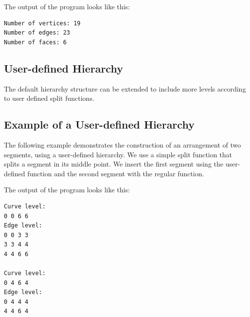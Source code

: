 
The output of the program looks like this:
\begin{verbatim}
Number of vertices: 19
Number of edges: 23
Number of faces: 6
\end{verbatim}

\begin{ccAdvanced}
\section{User-defined Hierarchy}

The default hierarchy structure can be extended to include more levels
according to user defined split functions.

\subsection{Example of a User-defined Hierarchy}
\label{ssec:example4}

The following example demonstrates the construction of an
arrangement of two segments, using a user-defined
hierarchy.
We use a simple split function that splits a segment in its middle
point. We insert the first segment using the user-defined function
and the second segment with the regular function.


The output of the program looks like this:
\begin{verbatim}
Curve level:
0 0 6 6
Edge level:
0 0 3 3
3 3 4 4
4 4 6 6

Curve level:
0 4 6 4
Edge level:
0 4 4 4
4 4 6 4
\end{verbatim}

\end{ccAdvanced}


